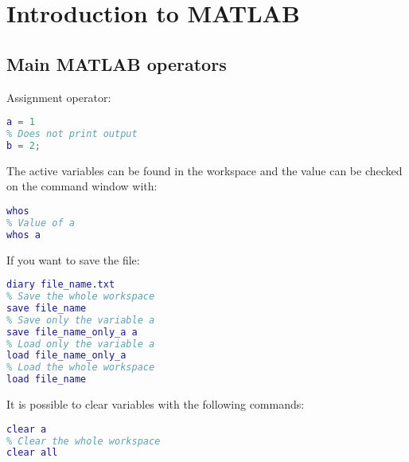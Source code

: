 \documentclass[12pt, a4paper]{report}
\begin{document}
\newpage

\tableofcontents

\newpage

\chapter{Introduction to MATLAB}
    \section{Main MATLAB operators}
    Assignment operator: 
    \begin{lstlisting}[language=Matlab]
% Print output
a = 1 
% Does not print output
b = 2;
    \end{lstlisting}
    The active variables can be found in the workspace and the value can be checked on the command window with: 
    \begin{lstlisting}[language=Matlab]
% Value of all variables
whos
% Value of a
whos a
    \end{lstlisting}
    If you want to save the file: 
    \begin{lstlisting}[language=Matlab]
% Save the command history
diary file_name.txt 
% Save the whole workspace
save file_name 
% Save only the variable a
save file_name_only_a a 
% Load only the variable a
load file_name_only_a 
% Load the whole workspace
load file_name 
    \end{lstlisting}
    It is possible to clear variables with the following commands: 
    \begin{lstlisting}[language=Matlab]
% Clear only the variable a
clear a 
% Clear the whole workspace
clear all 
    \end{lstlisting}
\end{document}
